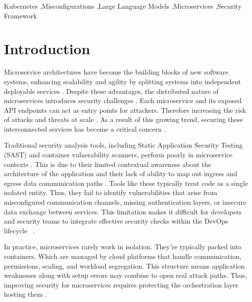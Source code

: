 \documentclass[preprint,12pt]{elsarticle}
\begin{document}
\begin{frontmatter}
\begin{keyword}
Kubernetes \sep Misconfigurations \sep Large Language Models \sep Microservices \sep Security Framework
\end{keyword}

\end{frontmatter}


















\section{Introduction}

Microservice architectures have become the building blocks of new software systems, enhancing scalability and agility by splitting systems into independent deployable services \cite{sowmya2023apitad}. Despite these advantages, the distributed nature of microservices introduces security challenges \cite{abdurrahman2024securemarketplace}. Each microservice and its exposed API endpoints can act as entry points for attackers. Therefore increasing the risk of attacks and threats at scale \cite{abdurrahman2024securemarketplace}. As a result of this growing trend, securing these interconnected services has become a critical concern \cite{haindl2024systematic}.


Traditional security analysis tools, including Static Application Security Testing (SAST) and container vulnerability scanners, perform poorly in microservice contexts \cite{unver2023}. This is due to their limited contextual awareness about the architecture of the application and their lack of ability to map out ingress and egress data communication paths \cite{chou2021}. Tools like these typically treat code as a single isolated entity. Thus, they fail to identify vulnerabilities that arise from misconfigured communication channels, missing authentication layers, or insecure data exchange between services. This limitation makes it difficult for developers and security teams to integrate effective security checks within the DevOps lifecycle ~\cite{zhang2024devsecops}.

In practice, microservices rarely work in isolation. They’re typically packed into containers. Which are managed by cloud platforms that handle communication, permissions, scaling, and workload segregation. This structure means application weaknesses along with setup errors may combine to open real attack paths. Thus, improving security for microservices requires protecting the orchestration layer hosting them \cite{dellimmagine2023kubehound,rahman2023k8s}.
\end{document}
